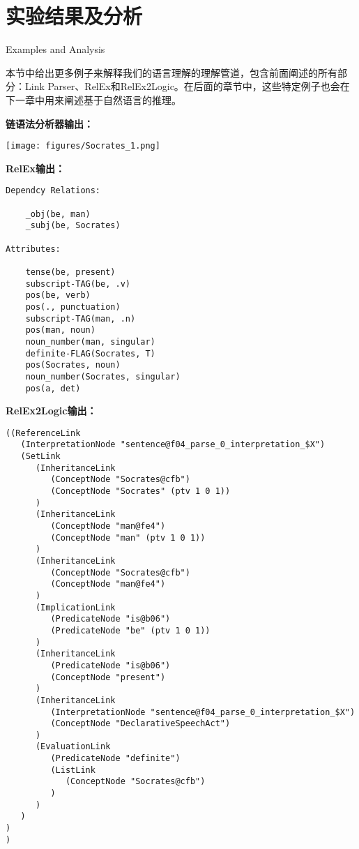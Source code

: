 \section{实验结果及分析}{Examples and Analysis}  

本节中给出更多例子来解释我们的语言理解的理解管道，包含前面阐述的所有部分：Link Parser、RelEx和RelEx2Logic。在后面的章节中，这些特定例子也会在下一章中用来阐述基于自然语言的推理。



{\bf 链语法分析器输出：}

\texttt{[image: figures/Socrates\_1.png]}

{\bf RelEx输出：}

\begin{verbatim}
Dependcy Relations:

    _obj(be, man)
    _subj(be, Socrates)

Attributes:

    tense(be, present)
    subscript-TAG(be, .v)
    pos(be, verb)
    pos(., punctuation)
    subscript-TAG(man, .n)
    pos(man, noun)
    noun_number(man, singular)
    definite-FLAG(Socrates, T)
    pos(Socrates, noun)
    noun_number(Socrates, singular)
    pos(a, det)

\end{verbatim}

{\bf RelEx2Logic输出：}

 {\tt\begin{small}\begin{lstlisting}
((ReferenceLink
   (InterpretationNode "sentence@f04_parse_0_interpretation_$X")
   (SetLink
      (InheritanceLink
         (ConceptNode "Socrates@cfb")
         (ConceptNode "Socrates" (ptv 1 0 1))
      )
      (InheritanceLink
         (ConceptNode "man@fe4")
         (ConceptNode "man" (ptv 1 0 1))
      )
      (InheritanceLink
         (ConceptNode "Socrates@cfb")
         (ConceptNode "man@fe4")
      )
      (ImplicationLink
         (PredicateNode "is@b06")
         (PredicateNode "be" (ptv 1 0 1))
      )
      (InheritanceLink
         (PredicateNode "is@b06")
         (ConceptNode "present")
      )
      (InheritanceLink
         (InterpretationNode "sentence@f04_parse_0_interpretation_$X")
         (ConceptNode "DeclarativeSpeechAct")
      )
      (EvaluationLink
         (PredicateNode "definite")
         (ListLink
            (ConceptNode "Socrates@cfb")
         )
      )
   )
)
)
\end{lstlisting}\end{small}}


